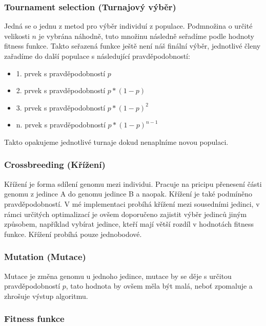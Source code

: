 \documentclass{article}
\begin{document}
    \subsubsection{Tournament selection (Turnajový výběr)}

    Jedná se o jednu z metod pro výběr individuí z populace. Podmnožina o určité velikosti $n$ je vybrána náhodně, tuto množinu následně seřadíme podle hodnoty
    fitness funkce. Takto seřazená funkce ještě není náš finální výběr, jednotlivé členy zařadíme do další populace s následující pravděpodobností:
    \begin{itemize}
        \item {1. prvek s pravděpodobností $p$}
        \item {2. prvek s pravděpodobností $p*(1-p)$}
        \item {3. prvek s pravděpodobností $p*(1-p)^2$}
        \item {n. prvek s pravděpodobností $p*(1-p)^{n-1}$}
    \end{itemize}

    Takto opakujeme jednotlivé turnaje dokud nenaplníme novou populaci.

    \subsubsection{Crossbreeding (Křížení)}

    Křížení je forma sdílení genomu mezi individui. Pracuje na pricipu přenesení části genomu z jedince A do genomu jedince B a naopak. Křížení je také podmíněno pravděpodobností.
    V mé implementaci probíhá křížení mezi sousedními jedinci, v rámci určitých optimalizací je ovšem doporučeno zajistit výběr jedinců jiným způsobem, například vybírat jedince, kteří
    mají větší rozdíl v hodnotách fitness funkce. Křížení probíhá pouze jednobodové.

    \subsubsection{Mutation (Mutace)}

    Mutace je změna genomu u jednoho jedince, mutace by se děje s určitou pravděpodobností $p$, tato hodnota by ovšem měla být malá, neboť zpomaluje a zhrošuje výstup algoritmu.

    \subsubsection{Fitness funkce}
\end{document}
